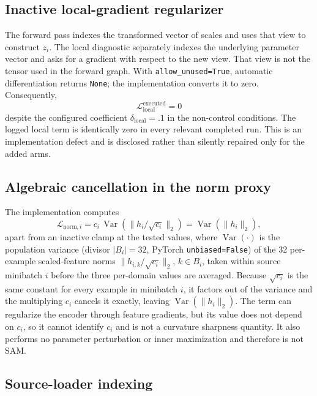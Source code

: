 \documentclass[10pt]{article}
\begin{document}
\subsection{Inactive local-gradient regularizer}

The forward pass indexes the transformed vector of scales and uses that view to
construct $z_i$. The local diagnostic separately indexes the underlying
parameter vector and asks for a gradient with respect to the new view.
That view is not the tensor used in the forward graph. With
\texttt{allow\_unused=True}, automatic differentiation returns
\texttt{None}; the implementation converts it to zero. Consequently,
\begin{equation}
\mathcal L_{\mathrm{local}}^{\mathrm{executed}}=0
\end{equation}
despite the configured coefficient $\delta_{\mathrm{local}}=.1$ in the
non-control conditions. The logged local term is identically zero in every
relevant completed run. This is an implementation defect and is disclosed
rather than silently repaired only for the added arms.

\subsection{Algebraic cancellation in the norm proxy}

The implementation computes
\begin{equation}
\mathcal L_{\mathrm{norm},i}
=c_i\,\operatorname{Var}\!\left(\|h_i/\sqrt{c_i}\|_2\right)
=\operatorname{Var}(\|h_i\|_2),
\end{equation}
apart from an inactive clamp at the tested values, where
$\operatorname{Var}(\cdot)$ is the population variance (divisor $|B_i|=32$,
PyTorch \texttt{unbiased=False}) of the 32 per-example scaled-feature norms
$\|h_{i,k}/\sqrt{c_i}\|_2$, $k\in B_i$, taken within source minibatch $i$
before the three per-domain values are averaged. Because $\sqrt{c_i}$ is the
same constant for every example in minibatch $i$, it factors out of the
variance and the multiplying $c_i$ cancels it exactly, leaving
$\operatorname{Var}(\|h_i\|_2)$. The term can regularize the
encoder through feature gradients, but its value does not depend on $c_i$, so
it cannot identify $c_i$ and is not a curvature sharpness quantity. It also
performs no parameter perturbation or inner maximization and therefore is not
SAM.

\subsection{Source-loader indexing}
\end{document}
